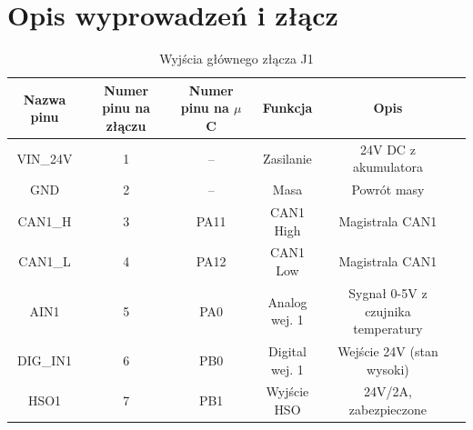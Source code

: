 \chapter{Opis wyprowadzeń i złącz}\label{chap:wyprowadzenia}


\begin{table}[H]
	\centering
	\caption{Wyjścia głównego złącza J1}
	\label{tab:wyprowadzenia_zlacza_1}
	\begin{tabular}{cccccc}
		\toprule
		\textbf{Nazwa pinu} & \textbf{Numer pinu na złączu} & \textbf{Numer pinu na $\mu$C} & \textbf{Funkcja} & \textbf{Opis} \\
		\midrule
		VIN\_24V  & 1  & -- & Zasilanie & 24V DC z akumulatora \\
		GND       & 2  & -- & Masa      & Powrót masy \\
		CAN1\_H   & 3  & PA11 & CAN1 High & Magistrala CAN1 \\
		CAN1\_L   & 4  & PA12 & CAN1 Low  & Magistrala CAN1 \\
		AIN1      & 5  & PA0  & Analog wej. 1 & Sygnał 0-5V z czujnika temperatury \\
		DIG\_IN1  & 6  & PB0  & Digital wej. 1 & Wejście 24V (stan wysoki) \\
		HSO1      & 7  & PB1  & Wyjście HSO & 24V/2A, zabezpieczone \\
		\midrule
		
		\bottomrule
	\end{tabular}
\end{table}